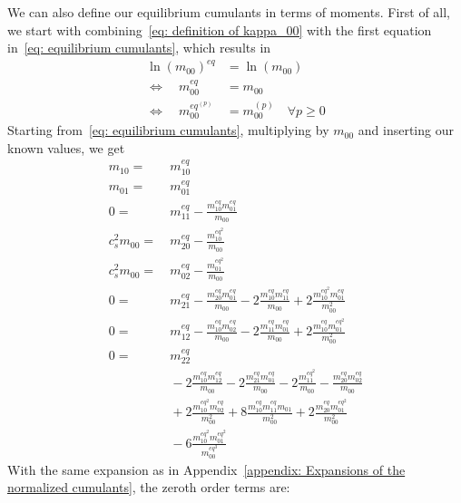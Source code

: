 We can also define our equilibrium cumulants in terms of moments.
First of all, we start with combining~\eqref{eq: definition of kappa_00} with the first equation in~\eqref{eq: equilibrium cumulants}, which results in
\begin{equation}
  \label{eq: m 00 invariant}
  \begin{aligned}
    {\ln(m_{00})}^{eq} &= \ln(m_{00}) \\
    \Leftrightarrow\quad m_{00}^{eq} &= m_{00} \\
    \Leftrightarrow\quad m_{00}^{eq^{(p)}} &= m_{00}^{(p)} \quad\forall p\ge 0
  \end{aligned}
\end{equation}
Starting from~\eqref{eq: equilibrium cumulants}, multiplying by $m_{00}$ and inserting our known values, we get
\begin{equation}
  \begin{aligned}
    m_{10} = &\ m_{10}^{eq}
    \\
     m_{01} = &\ m_{01}^{eq}
    \\
    0 = &\ m_{11}^{eq} - \frac{m_{10}^{eq}m_{01}^{eq}}{m_{00}}
    \\
    c_s^2 m_{00} = &\ m_{20}^{eq} - \frac{m_{10}^{{eq}^2}}{m_{00}}
    \\
    c_s^2 m_{00} = &\ m_{02}^{eq} - \frac{m_{01}^{{eq}^2}}{m_{00}}
    \\
    0 = &\ m_{21}^{eq} - \frac{m_{20}^{eq}m_{01}^{eq}}{m_{00}} - 2\frac{m_{10}^{eq}m_{11}^{eq}} {m_{00}} + 2\frac{m_{10}^{{eq}^2} m_{01}^{eq}}{m_{00}^2}
    \\
    0 = &\ m_{12}^{eq} - \frac{m_{10}^{eq}m_{02}^{eq}}{m_{00}}
    - 2\frac{m_{11}^{eq}m_{01}^{eq}}{m_{00}} + 2\frac{m_{10}^{eq} m_{01}^{{eq}^2}}{m_{00}^2}
    \\
    0 = &\ m_{22}^{eq}
    \\&\
    - 2 \frac{m_{10}^{eq}m_{12}^{eq}}{m_{00}} - 2\frac{m_{21}^{eq}m_{01}^{eq}}{m_{00}}
    - 2 \frac{m_{11}^{{eq}^2}}{m_{00}} - \frac{m_{20}^{eq}m_{02}^{eq}}{m_{00}}
    \\&\
    + 2 \frac{m_{10}^{{eq}^2} m_{02}^{eq}}{m_{00}^2} + 8 \frac{m_{10}^{eq}m_{11}^{eq}m_{01}} {m_{00}^2}
    + 2 \frac{m_{20}^{eq}m_{01}^{{eq}^2}}{m_{00}^2}
    \\&\
    - 6 \frac{m_{10}^{{eq}^2} m_{01}^{{eq}^2}}{m_{00}^{{eq}^3}}
  \end{aligned}
\end{equation}
With the same expansion as in Appendix~\ref{appendix: Expansions of the normalized cumulants}, the zeroth order terms are:
